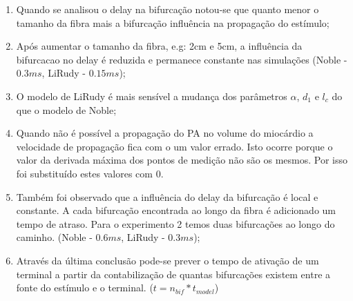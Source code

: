 \documentclass[]{article}
\begin{document}
\begin{enumerate}
		\item Quando se analisou o delay na bifurcação notou-se que quanto menor o tamanho da fibra mais a bifurcação influência na propagação do estímulo;
		
		\item Após aumentar o tamanho da fibra, e.g: 2cm e 5cm, a influência da bifurcacao no delay é reduzida e permanece constante nas simulações (Noble - $0.3 ms$, LiRudy - $0.15 ms$);
		
		\item O modelo de LiRudy é mais sensível a mudança dos parâmetros $\alpha$, $d_1$ e $l_c$ do que o modelo de Noble;
		
		\item Quando não é possível a propagação do PA no volume do miocárdio a velocidade de propagação fica com o um valor errado. Isto ocorre porque o valor da derivada máxima dos pontos de medição não são os mesmos. Por isso foi substituído estes valores com 0.
		
		\item Também foi observado que a influência do delay da bifurcação é local e constante. A cada bifurcação encontrada ao longo da fibra é adicionado um tempo de atraso. Para o experimento 2 temos duas bifurcações ao longo do caminho. (Noble - $0.6 ms$, LiRudy - $0.3 ms$);
		
		\item Através da última conclusão pode-se prever o tempo de ativação de um terminal a partir da contabilização de quantas bifurcações existem entre a fonte do estímulo e o terminal. ($t = n_{bif}*t_{model}$)
			
	\end{enumerate}	
\end{document}
